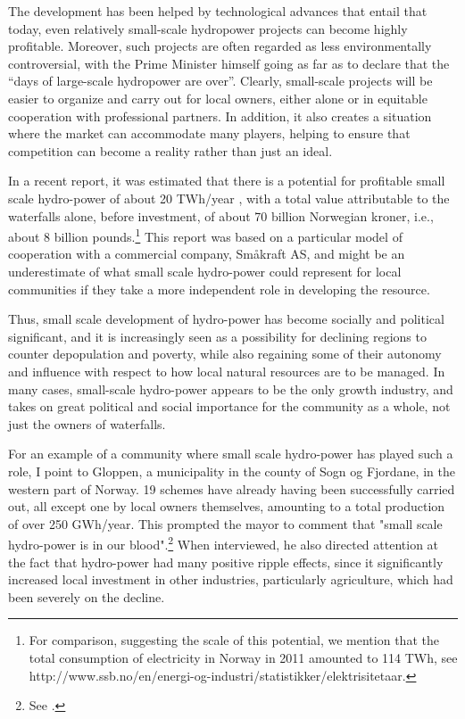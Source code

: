 The development has been helped by technological advances that entail that today, even relatively small-scale hydropower projects can become highly profitable. Moreover, such projects are often regarded as less environmentally controversial, with the Prime Minister himself going as far as to declare that the ``days of large-scale hydropower are over''.  Clearly, small-scale projects will be easier to organize and carry out for local owners, either alone or in equitable cooperation with professional partners. In addition, it   also creates a situation where the market can accommodate many players, helping to ensure that competition can become a reality rather than just an ideal.

In a recent report, it was estimated that there is a potential for profitable small scale hydro-power of about 20 TWh/year \cite{Aanesland}, with a total value attributable to the waterfalls alone, before investment, of about 70 billion Norwegian kroner, i.e., about 8 billion pounds.\footnote{For comparison, suggesting the scale of this potential, we mention that the total consumption of electricity in Norway in 2011 amounted to 114 TWh, see http://www.ssb.no/en/energi-og-industri/statistikker/elektrisitetaar.}  This report was based on a particular model of cooperation with a commercial company, Småkraft AS, and might be an underestimate of what small scale hydro-power could represent for local communities if they take a more independent role in developing the resource. 

Thus, small scale development of hydro-power has become socially and political significant, and it is increasingly seen as a possibility for declining regions to counter depopulation and poverty, while also regaining some of their autonomy and influence with respect to how local natural resources are to be managed. In many cases, small-scale hydro-power appears to be the only growth industry, and takes on great political and social importance for the community as a whole, not just the owners of waterfalls.

For an example of a community where small scale hydro-power has played such a role, I point to Gloppen, a municipality in the county of Sogn og Fjordane, in the western part of Norway. 19 schemes have already having been successfully carried out, all except one by local owners themselves, amounting to a total production of over 250 GWh/year. This prompted the mayor to comment that "small scale hydro-power is in our blood".\footnote{See \cite{Gloppen}.} When interviewed, he also directed attention at the fact that hydro-power had many positive ripple effects, since it significantly increased local investment in other industries, particularly agriculture, which had been severely on the decline.

